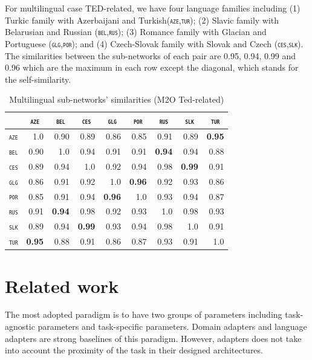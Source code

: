 \documentclass[11pt]{article}
\newcommand{\domain}[1]{\texttt{\textsc{#1}}}
\newcommand{\SB}[1]{\textbf{#1}}
\begin{document}
For multilingual case TED-related, we have four language families including (1) Turkic family with Azerbaijani and Turkish(\domain{aze},\domain{tur}); (2) Slavic family with Belarusian and Russian (\domain{bel},\domain{rus}); (3) Romance family with Glacian and Portuguese (\domain{glg},\domain{por}); and (4) Czech-Slovak family with Slovak and Czech (\domain{ces},\domain{slk}). The similarities between the sub-networks of each pair are 0.95, 0.94, 0.99 and 0.96 which are the maximum in each row except the diagonal, which stands for the self-similarity.
\begin{table}[h!]
  \centering
  \begin{tabular}{|p{1cm}|*{8}{r|}} \hline
    & \multicolumn{1}{c|}{\domain{aze}} & \multicolumn{1}{c|}{\domain{bel}}& \multicolumn{1}{c|}{\domain{ces}} & \multicolumn{1}{c|}{\domain{glg}} & \multicolumn{1}{c|}{\domain{por}} & \multicolumn{1}{c|}{\domain{rus}} &\multicolumn{1}{c|}{\domain{slk}}&\multicolumn{1}{c|}{\domain{tur}} \\ \hline 
    \domain{aze} &1.0&0.90&0.89&0.86&0.85&0.91&0.89&\SB{0.95}\\
    \domain{bel} &0.90&1.0&0.94&0.91&0.91&\SB{0.94}&0.94&0.88\\
    \domain{ces} &0.89&0.94&1.0&0.92&0.94&0.98&\SB{0.99}&0.91\\
    \domain{glg} &0.86&0.91&0.92&1.0&\SB{0.96}&0.92&0.93&0.86\\ 
    \domain{por} &0.85&0.91&0.94&\SB{0.96}&1.0&0.93&0.94&0.87\\ 
    \domain{rus} &0.91&\SB{0.94}&0.98&0.92&0.93&1.0&0.98&0.93\\
    \domain{slk} &0.89&0.94&\SB{0.99}&0.93&0.94&0.98&1.0&0.91\\
    \domain{tur} &\SB{0.95}&0.88&0.91&0.86&0.87&0.93&0.91&1.0\\
    \hline
  \end{tabular}
  \caption{Multilingual sub-networks' similarities (M2O Ted-related)}
  \label{tab:related-sim}
\end{table}

\section{Related work}
The most adopted paradigm is to have two groups of parameters including task-agnostic parameters and task-specific parameters. Domain adapters and language adapters are strong baselines of this paradigm. However, adapters does not take into account the proximity of the task in their designed architectures. 
\end{document}
